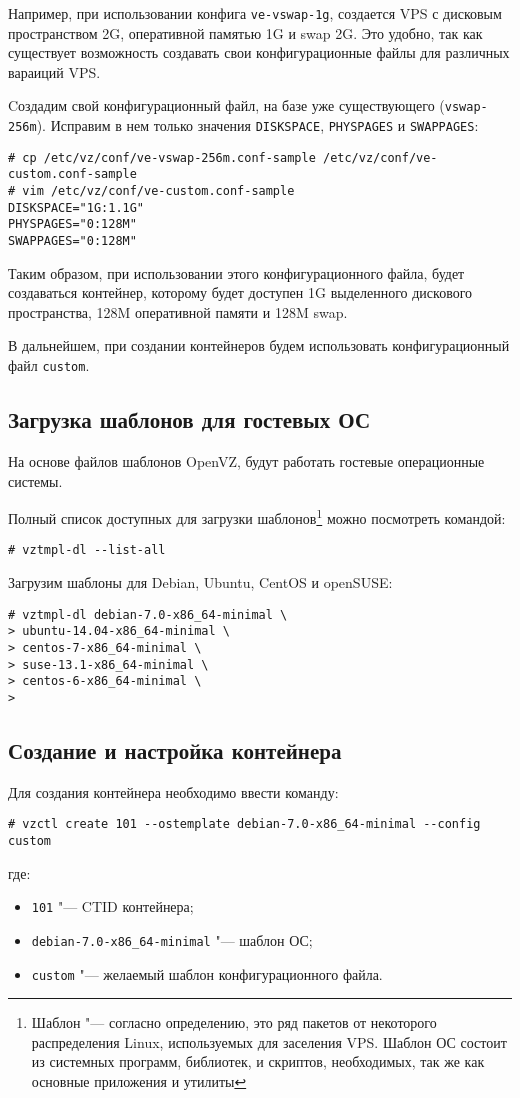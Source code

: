 Например, при использовании конфига \texttt{ve-vswap-1g}, создается VPS с дисковым пространством 2G, оперативной памятью 1G и swap 2G.
Это удобно, так как существует возможность создавать свои конфигурационные файлы для различных вараиций VPS.

Cоздадим свой конфигурационный файл, на базе уже существующего (\texttt{vswap-256m}).
Исправим в нем только значения \texttt{DISKSPACE}, \texttt{PHYSPAGES} и \texttt{SWAPPAGES}:
\begin{lstlisting}
# cp /etc/vz/conf/ve-vswap-256m.conf-sample /etc/vz/conf/ve-custom.conf-sample
# vim /etc/vz/conf/ve-custom.conf-sample
DISKSPACE="1G:1.1G"
PHYSPAGES="0:128M"
SWAPPAGES="0:128M"
\end{lstlisting}

Таким образом, при использовании этого конфигурационного файла, будет создаваться контейнер, которому будет доступен 1G выделенного дискового пространства, 128M оперативной памяти и 128M swap.

В дальнейшем, при создании контейнеров будем использовать конфигурационный файл \texttt{custom}.

\subsection{Загрузка шаблонов для гостевых ОС}
На основе файлов шаблонов OpenVZ, будут работать гостевые операционные системы.

Полный список доступных для загрузки шаблонов\footnote{Шаблон "--- согласно определению, это ряд пакетов от некоторого распределения Linux, используемых для заселения VPS.
Шаблон ОС состоит из системных программ, библиотек, и скриптов, необходимых, так же как основные приложения и утилиты} можно посмотреть командой:
\begin{lstlisting}
# vztmpl-dl --list-all
\end{lstlisting}

Загрузим шаблоны для Debian, Ubuntu, CentOS и openSUSE:
\begin{lstlisting}
# vztmpl-dl debian-7.0-x86_64-minimal \
> ubuntu-14.04-x86_64-minimal \
> centos-7-x86_64-minimal \
> suse-13.1-x86_64-minimal \
> centos-6-x86_64-minimal \
> 
\end{lstlisting}

\subsection{Создание и настройка контейнера}
Для создания контейнера необходимо ввести команду:
\begin{lstlisting}
# vzctl create 101 --ostemplate debian-7.0-x86_64-minimal --config custom
\end{lstlisting}
где:
\begin{itemize}
    \item \texttt{101} "--- CTID контейнера;
    \item \texttt{debian-7.0-x86\_64-minimal} "--- шаблон ОС;
    \item \texttt{custom} "--- желаемый шаблон конфигурационного файла.
\end{itemize}

